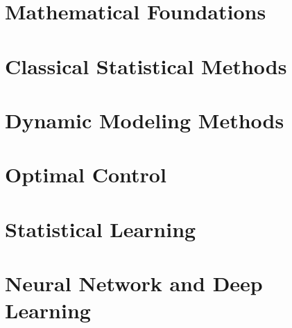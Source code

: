 \documentclass[oneside,hidelinks,12pt,letterpaper]{scrbook} %
\theoremstyle{remark}
\theoremstyle{coloredRemark}
\theoremstyle{coloredNote}
\begin{document}
\hypersetup{
	colorlinks=true,
	linkcolor=blue}

\mainmatter

\printnomenclature





\part{Mathematical Foundations}



%
%


%

\part{Classical Statistical Methods}


%

%

%

\part{Dynamic Modeling Methods}


%
%
%
%
%

\part{Optimal Control}
%


%



\part{Statistical Learning}


\part{Neural Network and Deep Learning}






\appendix




\printindex
\end{document}
